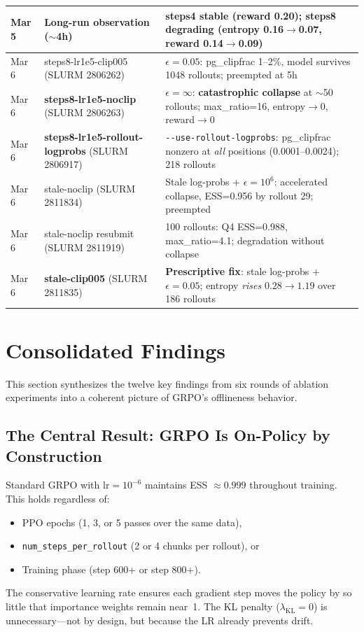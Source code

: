 \documentclass[11pt,a4paper]{article}
\begin{document}
\begin{table}[H]
\begin{tabular}{@{}llp{7cm}@{}}
Mar 5 & Long-run observation ($\sim$4h) & steps4 stable (reward 0.20); steps8 degrading (entropy 0.16$\to$0.07, reward 0.14$\to$0.09) \\
\midrule
Mar 6 & steps8-lr1e5-clip005 (SLURM 2806262) & $\epsilon = 0.05$: pg\_clipfrac 1--2\%, model survives 1048 rollouts; preempted at 5h \\
Mar 6 & \textbf{steps8-lr1e5-noclip} (SLURM 2806263) & $\epsilon = \infty$: \textbf{catastrophic collapse} at $\sim$50 rollouts; max\_ratio=16, entropy$\to$0, reward$\to$0 \\
Mar 6 & \textbf{steps8-lr1e5-rollout-logprobs} (SLURM 2806917) & \texttt{-{}-use-rollout-logprobs}: pg\_clipfrac nonzero at \emph{all} positions (0.0001--0.0024); 218 rollouts \\
Mar 6 & stale-noclip (SLURM 2811834) & Stale log-probs + $\epsilon = 10^6$: accelerated collapse, ESS=0.956 by rollout 29; preempted \\
Mar 6 & stale-noclip resubmit (SLURM 2811919) & 100 rollouts: Q4 ESS=0.988, max\_ratio=4.1; degradation without collapse \\
Mar 6 & \textbf{stale-clip005} (SLURM 2811835) & \textbf{Prescriptive fix}: stale log-probs + $\epsilon = 0.05$; entropy \emph{rises} $0.28 \to 1.19$ over 186 rollouts \\
\bottomrule
\end{tabular}
\end{table}


\section{Consolidated Findings}
\label{sec:findings}

This section synthesizes the twelve key findings from six rounds of ablation
experiments into a coherent picture of GRPO's offlineness behavior.

\subsection{The Central Result: GRPO Is On-Policy by Construction}

Standard GRPO with $\mathrm{lr} = 10^{-6}$ maintains ESS $\approx 0.999$
throughout training. This holds regardless of:
\begin{itemize}[leftmargin=*]
  \item PPO epochs (1, 3, or 5 passes over the same data),
  \item \texttt{num\_steps\_per\_rollout} (2 or 4 chunks per rollout), or
  \item Training phase (step 600+ or step 800+).
\end{itemize}
The conservative learning rate ensures each gradient step moves the policy
by so little that importance weights remain near~1. The KL penalty
($\lambda_{\mathrm{KL}} = 0$) is unnecessary---not by design, but because the
LR already prevents drift.
\end{document}
